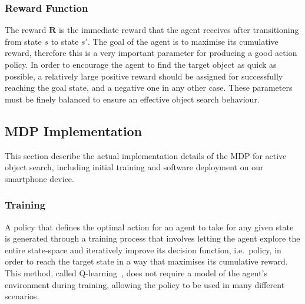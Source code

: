 \documentclass[a4paper, twoside]{article}
\begin{document}
\subsubsection{Reward Function}

\noindent The reward $\mathbf{R}$ is the immediate reward that the agent receives after transitioning from state $s$ to state $s'$.
% 
% 
The goal of the agent is to maximise its cumulative reward, therefore this is a very important parameter for producing a good action policy. In order to encourage the agent to find the target object as quick as possible, a relatively large positive reward should be assigned for successfully reaching the goal state, and a negative one in any other case. These parameters must be finely balanced to ensure an effective object search behaviour.



\subsection{MDP Implementation}

This section describe the actual implementation details of the MDP for active object search, including initial training and software deployment on our smartphone device.

\subsubsection{Training} \label{sec:training}

\noindent A policy that defines the optimal action for an agent to take for any given state is generated through a training process that involves letting the agent explore the entire state-space and iteratively improve its decision function, i.e.\ policy, in order to reach the target state in a way that maximises its cumulative reward. This method, called Q-learning~\cite{Watkins1992}, does not require a model of the agent's environment during training, allowing the policy to be used in many different scenarios.
\end{document}
